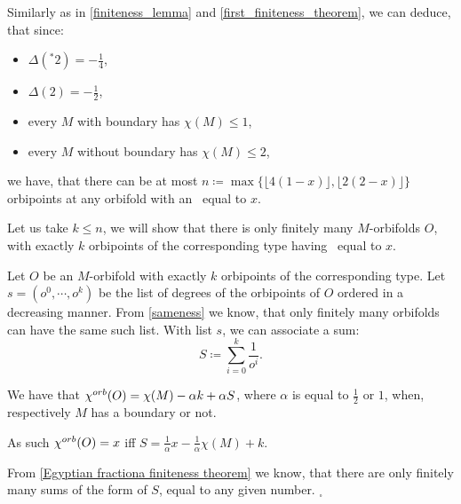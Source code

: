 Similarly as in \ref{finiteness_lemma} and \ref{first_finiteness_theorem}, 
we can deduce, that since:
\begin{itemize} 
\item $\Delta(^*2) = -\frac{1}{4}$,
\item $\Delta(2) = -\frac{1}{2}$,
\item every $M$ with boundary has $\chi(M) \leq 1$,
\item every $M$ without boundary has $\chi(M) \leq 2$,
\end{itemize}
we have, that there can be at most 
$n \coloneqq \max \{\lfloor 4(1-x) \rfloor, \lfloor 2(2-x) \rfloor\}$ 
orbipoints at any orbifold with an \Eoc\ equal to $x$. 

Let us take $k\leq n$, we will show that there is only finitely many $M$-orbifolds $O$,
with exactly $k$ orbipoints of the corresponding type having \Eoc\ equal to $x$. 

Let $O$ be an $M$-orbifold with exactly $k$ orbipoints of the corresponding type. Let 
$s = (o^0, \cdots, o^{k})$ be the list of degrees of 
the orbipoints  
of $O$ ordered in a decreasing manner. From \ref{sameness} we know, that only finitely 
many orbifolds can have the same such list.  
With list $s$, we can associate a sum:
\begin{equation} 
S \coloneqq \sum_{i=0}^k \frac{1}{o^i}.
\end{equation} 

We have that ${\chi^{orb}(O)} = \chi(M) - \alpha k + \alpha S$, where $\alpha$ is 
equal to $\frac{1}{2}$ or $1$, when, respectively $M$ has a boundary or not. 

As such ${\chi^{orb}(O)} = x$ iff $S = \frac{1}{\alpha}x-\frac{1}{\alpha}\chi(M) + k$.  

From \ref{Egyptian fractiona finiteness theorem} we know, that there are only finitely many 
sums of the form of $S$, equal to any given number. $_\square$

 

